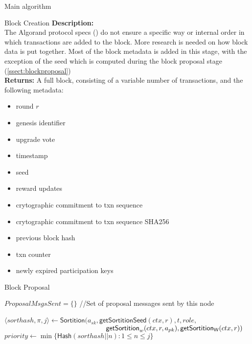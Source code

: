 \documentclass[10pt,a4paper]{article}
\begin{document}
\begin{section}{Main algorithm}
\begin{subsection}{Block Creation}
\noindent \textbf{Description:}\\
The Algorand protocol specs (\cite{DBLP:conf/sosp/GiladHMVZ17}) do not ensure a specific way 
or internal order in which transactions are added to the block.
More research is needed on how block data is put together.
Most of the block metadata is added in this stage, with the exception of the seed
which is computed during the block proposal stage (\ref{ssect:blockproposal})\\

\noindent \textbf{Returns:} 
A full block, consisting of a variable number of transactions, and the following metadata:
\begin{itemize}
    \item round $r$
    \item genesis identifier
    \item upgrade vote
    \item timestamp
    \item seed
    \item reward updates
    \item crytographic commitment to txn sequence
    \item crytographic commitment to txn sequence SHA256
    \item previous block hash
    \item txn counter
    \item newly expired participation keys
  \end{itemize}

\end{subsection}
\begin{subsection}{Block Proposal}\label{ssect:blockproposal}

\begin{algorithm}
    \begin{algorithmic}[1]
        \State $ProposalMsgsSent = \{\}$ //Set of proposal messages sent by this node

            \State $\langle sorthash, \pi, j\rangle\gets 
            \mathsf{Sortition}(
                a_{sk}, 
                \mathsf{getSortitionSeed}(ctx, r), 
                t, 
                role, $ \newline
                ${}$ ${\hskip 5.2cm}\mathsf{getSortition}_w(ctx, r, a_{pk}), 
                \mathsf{getSortition_W}(ctx, r)
            )$
                \State $priority \gets \min\{\mathsf{Hash}(sorthash || n):1\le n\le j\}$


\end{algorithmic}
\end{algorithm}
\end{subsection}
\end{section}
\end{document}
